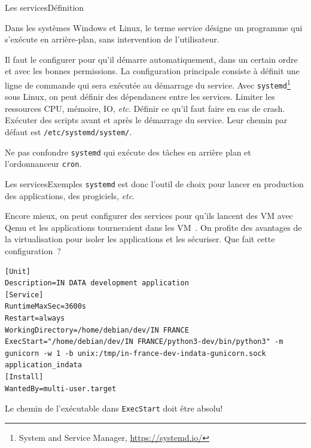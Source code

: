 \documentclass{beamer}
\begin{document}
    \begin{frame}{Les services}{Définition}
        \begin{footnotesize}
            Dans les systèmes Windows et Linux, le terme service désigne un programme qui s'exécute en arrière-plan, sans intervention de l'utilisateur.

            Il faut le configurer pour qu'il démarre automatiquement, dans un certain ordre et avec les bonnes permissions.
            \bigbreak
            La configuration principale consiste à définit une ligne de commande qui sera exécutée au démarrage du service.
            \bigbreak
            Avec \lstinline{systemd}\footnote{System and Service Manager, \url{https://systemd.io/}} sous Linux, on peut définir des dépendances entre les services.
            Limiter les ressources CPU, mémoire, IO, \textit{etc}.
            Définir ce qu'il faut faire en cas de crash.
            Exécuter des scripts avant et après le démarrage du service.
            \bigbreak
            Leur chemin par défaut est \lstinline{/etc/systemd/system/}.
            \begin{dangercolorbox}
                Ne pas confondre \lstinline{systemd} qui exécute des tâches en arrière plan et l'ordonnanceur \lstinline{cron}.
            \end{dangercolorbox}
        \end{footnotesize}
    \end{frame}

    \begin{frame}[fragile]{Les services}{Exemples}
        \lstinline{systemd} est donc l'outil de choix pour lancer en production des applications, des progiciels, \textit{etc}.

        Encore mieux, on peut configurer des services pour qu'ils lancent des VM avec Qemu et les applications tourneraient dans les VM~.
        On profite des avantages de la virtualisation pour isoler les applications et les sécuriser.
        \bigbreak
        Que fait cette configuration~?
        \begin{lstlisting}
[Unit]
Description=IN DATA development application
[Service]
RuntimeMaxSec=3600s
Restart=always
WorkingDirectory=/home/debian/dev/IN FRANCE
ExecStart="/home/debian/dev/IN FRANCE/python3-dev/bin/python3" -m gunicorn -w 1 -b unix:/tmp/in-france-dev-indata-gunicorn.sock application_indata
[Install]
WantedBy=multi-user.target
        \end{lstlisting}
        \begin{dangercolorbox}
            Le chemin de l'exécutable dans \lstinline{ExecStart} doit être absolu!
        \end{dangercolorbox}
    \end{frame}
\end{document}

